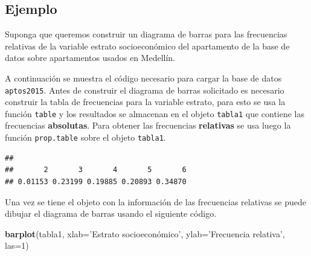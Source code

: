 \documentclass[10pt,]{krantz}
\makeatletter
\newenvironment{Shaded}{\begin{snugshade}}{\end{snugshade}}
\newcommand{\KeywordTok}[1]{\textcolor[rgb]{0.13,0.29,0.53}{\textbf{{#1}}}}
\newcommand{\DataTypeTok}[1]{\textcolor[rgb]{0.13,0.29,0.53}{{#1}}}
\newcommand{\DecValTok}[1]{\textcolor[rgb]{0.00,0.00,0.81}{{#1}}}
\newcommand{\StringTok}[1]{\textcolor[rgb]{0.31,0.60,0.02}{{#1}}}
\newcommand{\NormalTok}[1]{{#1}}
\newenvironment{kframe}{%
\medskip{}
\setlength{\fboxsep}{.8em}
 \def\at@end@of@kframe{}%
 \ifinner\ifhmode%
  \def\at@end@of@kframe{\end{minipage}}%
  \begin{minipage}{\columnwidth}%
 \fi\fi%
 \def\FrameCommand##1{\hskip\@totalleftmargin \hskip-\fboxsep
 \colorbox{shadecolor}{##1}\hskip-\fboxsep
     \hskip-\linewidth \hskip-\@totalleftmargin \hskip\columnwidth}%
 \MakeFramed {\advance\hsize-\width
   \@totalleftmargin\z@ \linewidth\hsize
   \@setminipage}}%
 {\par\unskip\endMakeFramed%
 \at@end@of@kframe}
\renewenvironment{Shaded}{\begin{kframe}}{\end{kframe}}
\makeatother
\begin{document}
\subsection*{Ejemplo}\label{ejemplo-19}


Suponga que queremos construir un diagrama de barras para las
frecuencias relativas de la variable estrato socioeconómico del
apartamento de la base de datos sobre apartamentos usados en Medellín.

A continuación se muestra el código necesario para cargar la base de
datos \texttt{aptos2015}. Antes de construir el diagrama de barras
solicitado es necesario construir la tabla de frecuencias para la
variable estrato, para esto se usa la función \texttt{table} y los
resultados se almacenan en el objeto \texttt{tabla1} que contiene las
frecuencias \textbf{absolutas}. Para obtener las frecuencias
\textbf{relativas} se usa luego la función \texttt{prop.table} sobre el
objeto \texttt{tabla1}.

\begin{Shaded}
\end{Shaded}

\begin{verbatim}
## 
##       2       3       4       5       6 
## 0.01153 0.23199 0.19885 0.20893 0.34870
\end{verbatim}

Una vez se tiene el objeto con la información de las frecuencias
relativas se puede dibujar el diagrama de barras usando el siguiente
código.

\begin{Shaded}
\begin{Highlighting}[]
\KeywordTok{barplot}\NormalTok{(tabla1, }\DataTypeTok{xlab=}\StringTok{'Estrato socioeconómico'}\NormalTok{,}
        \DataTypeTok{ylab=}\StringTok{'Frecuencia relativa'}\NormalTok{, }\DataTypeTok{las=}\DecValTok{1}\NormalTok{)}
\end{Highlighting}
\end{Shaded}
\end{document}
